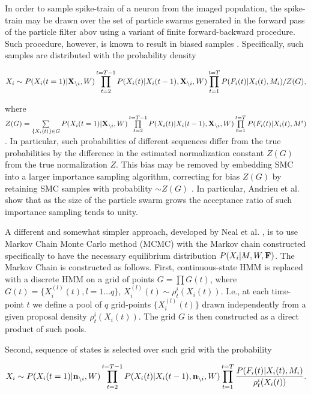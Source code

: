 In order to sample spike-train of a neuron from the imaged population, the spike-train may be drawn over the set of particle swarms generated in the forward pass of the particle filter abov using a variant of finite forward-backward procedure.  Such procedure, however, is known to result in biased samples \cite{Andrieu2007, NBR03}.
Specifically, such samples are distributed with the probability density

\begin{equation}
X_i \sim P(X_i(t=1)|{\bf X}_{\backslash i}, W)\prod\limits_{t=2}^{t=T-1}P(X_i(t)|X_i(t-1), {\bf X}_{\backslash i}, W)\prod\limits_{t=1}^{t=T}P(F_i(t)|X_i(t), M_i)/Z(G), 
\end{equation}

where $Z(G)=\sum\limits_{\{X_i(t)\}\in G}P(X_i(t=1)|{\bf X}_{\backslash i}, W)\prod\limits_{t=2}^{t=T-1}P(X_i(t)|X_i(t-1), {\bf X}_{\backslash i}, W) \prod\limits_{t=1}^{t=T}P(F_i(t)|X_i(t), M^i)$.  In particular, such probabilities of different sequences differ from the true probabilities by the difference in the estimated normalization constant $Z(G)$ from the true normalization $Z$.  This bias may be removed by embedding SMC into a larger importance sampling algorithm, correcting for bias $Z(G)$ by retaining SMC samples with probability $\sim Z(G)$ \cite{Andrieu2007}. In particular, Andrieu et al. \cite{Andrieu2007} show that as the size of the particle swarm grows the acceptance ratio of such importance sampling tends to unity.

A different and somewhat simpler approach, developed by Neal et al. \cite{NBR03}, is to use Markov Chain Monte Carlo method (MCMC) with the Markov chain constructed specifically to have the necessary equilibrium distribution $P(X_i|M, W, {\bf F})$. The Markov Chain is constructed as follows. First, continuous-state HMM is replaced with a discrete HMM on a grid of points $G=\prod G(t)$, where $G(t) = \{X_i^{(l)}(t), l=1\ldots q\}$, $X_i^{(l)}(t)\sim \rho^i_t(X_i(t))$. I.e., at each time-point $t$ we define a pool of $q$ grid-points $\{X_i^{(l)}(t)\}$ drawn independently from a given proposal density $\rho^i_t(X_i(t))$. The grid $G$ is then constructed as a direct product of such pools.

Second, sequence of states is selected over such grid with the probability

\begin{equation}\label{eqn:nealprob}
X_i\sim P(X_i(t=1)|{\bf n}_{\backslash i}, W)\prod\limits_{t=2}^{t=T-1}P(X_i(t)|X_i(t-1), {\bf n}_{\backslash i}, W)\prod\limits_{t=1}^{t=T}
\frac{P(F_i(t)|X_i(t), M_i)}{\rho^i_t(X_i(t))}.
\end{equation}

